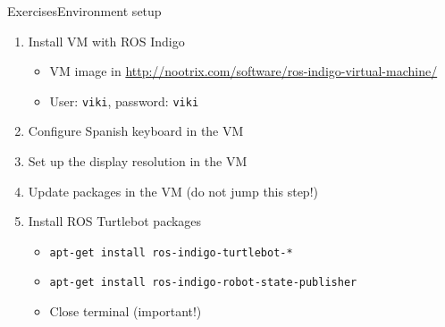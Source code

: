 \documentclass[10pt,compress]{beamer} %
\begin{document}
\begin{frame}{Exercises}{Environment setup}
	\begin{enumerate}
		\item Install VM with ROS Indigo
			\begin{itemize}
			\item VM image in \url{http://nootrix.com/software/ros-indigo-virtual-machine/}
			\item User: \texttt{viki}, password: \texttt{viki}
			\end{itemize}
		\item Configure Spanish keyboard in the VM
		\item Set up the display resolution in the VM
		\item Update packages in the VM (do not jump this step!)
		\item Install ROS Turtlebot packages
			\begin{itemize}
			\item \texttt{apt-get install ros-indigo-turtlebot-*}
			\item \texttt{apt-get install ros-indigo-robot-state-publisher}
			\item Close terminal (important!)
			\end{itemize}
	\end{enumerate}
\end{frame}
\end{document}
